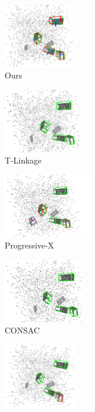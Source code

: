 \begin{figure}[ht]
  
      \begin{subfigure}{0.18\textwidth}
        \centering
        \includegraphics[height=2.8cm]{images/multi-ours.png}
          \caption{Ours}
          \label{fig:multi-result}
      \end{subfigure}
      \begin{subfigure}{0.18\textwidth}
        \centering
        \includegraphics[height=2.8cm]{images/multi-tlinkage.png}
          \caption{T-Linkage\cite{Tlinkage}}
          \label{fig:multi-tlinkage1}
      \end{subfigure}
      \begin{subfigure}{0.2\textwidth}
        \centering
        \includegraphics[height=2.8cm]{images/multi-progx.png}
          \caption{Progressive-X\cite{ProgressiveX}}
          \label{fig:multi-prox}
      \end{subfigure}
      \begin{subfigure}{0.2\textwidth}
        \centering
        \includegraphics[height=2.8cm]{images/multi-consac.png}
          \caption{CONSAC\cite{CONSAC}}
          \label{fig:multi-consac}
      \end{subfigure}
      \begin{subfigure}{0.18\textwidth}
        \centering
        \includegraphics[height=2.8cm]{images/multi-teaser.png}

\end{subfigure}
\end{figure}
